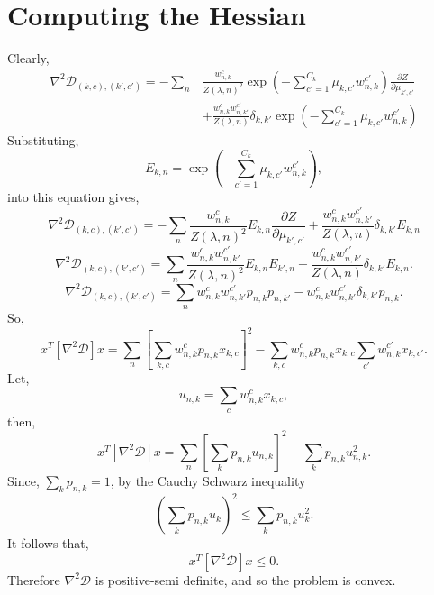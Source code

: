 \documentclass[12pt]{article}
\begin{document}
\section{Computing the Hessian}
Clearly,
\begin{align}
\nabla^2 \mathcal{D}_{(k,c), (k',c')}= -\sum_{n}&\frac{w^{c}_{n,k}}{ Z(\lambda, n)^2}\exp{\left(-\sum_{c'=1}^{C_k} \mu_{k,c'}  w^{c'}_{n,k}\right)}\frac{\partial Z}{\partial \mu_{k',c'}} \\
&+\frac{w^{c}_{n,k}w^{c'}_{n,k'}}{ Z(\lambda, n)}\delta_{k,k'}\exp{\left(-\sum_{c'=1}^{C_k} \mu_{k,c'}  w^{c'}_{n,k}\right)}
\end{align}
Substituting,
\begin{equation}
E_{k,n}=\exp{\left(-\sum_{c'=1}^{C_k} \mu_{k,c'}  w^{c'}_{n,k}\right)},
\end{equation}
into this equation gives,
\begin{equation}
\nabla^2 \mathcal{D}_{(k,c), (k',c')}= -\sum_{n}\frac{w^{c}_{n,k}}{ Z(\lambda, n)^2}E_{k,n}\frac{\partial Z}{\partial \mu_{k',c'}}
+\frac{w^{c}_{n,k}w^{c'}_{n,k'}}{ Z(\lambda, n)}\delta_{k,k'}E_{k,n}
\end{equation}
\begin{equation}
\nabla^2 \mathcal{D}_{(k,c), (k',c')}= \sum_{n}\frac{w^{c}_{n,k}w^{c'}_{n,k'}}{ Z(\lambda, n)^2}E_{k,n}E_{k',n}
-\frac{w^{c}_{n,k}w^{c'}_{n,k'}}{ Z(\lambda, n)}\delta_{k,k'}E_{k,n}.
\end{equation}
\begin{equation}
\nabla^2 \mathcal{D}_{(k,c), (k',c')}= \sum_{n} w^{c}_{n,k}w^{c'}_{n,k'} p_{n,k}p_{n,k'}
- w^{c}_{n,k}w^{c'}_{n,k'}\delta_{k,k'}p_{n,k}.
\end{equation}
So,
\begin{equation}
x^T \left[\nabla^2 \mathcal{D} \right]x = \sum_{n} \left[\sum_{k,c} w^{c}_{n,k} p_{n,k} x_{k,c}\right]^2
- \sum_{k,c} w^{c}_{n,k} p_{n,k} x_{k,c}\sum_{c'}w^{c'}_{n,k} x_{k,c'}.
\end{equation}
Let,
\begin{equation}
u_{n,k}=\sum_{c} w^{c}_{n,k} x_{k,c},
\end{equation} 
then,
\begin{equation}
x^T \left[\nabla^2 \mathcal{D} \right]x = \sum_{n} \left[\sum_{k}  p_{n,k} u_{n,k}\right]^2
- \sum_{k} p_{n,k} u_{n,k}^2.
\end{equation}
Since, $\sum_k p_{n,k}=1$, by the Cauchy Schwarz inequality
\begin{equation}
\left( \sum_k p_{n,k} u_{k} \right)^2 \le \sum_{k} p_{n,k}u_k^2. 
\end{equation}
It follows that,
\begin{equation}
x^T \left[\nabla^2 \mathcal{D} \right]x \le 0.
\end{equation}
Therefore $\nabla^2 \mathcal{D}$ is positive-semi definite, and so the problem is convex.
\end{document}
